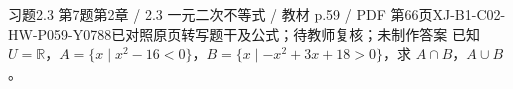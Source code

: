 \par\noindent\begin{minipage}{\linewidth}
\begin{bankitem}{习题2.3 第7题}{第2章 / 2.3 一元二次不等式 / 教材 p.59 / PDF 第66页}{XJ-B1-C02-HW-P059-Y0788}{已对照原页转写题干及公式；待教师复核；未制作答案}
已知 $U=\mathbb R$，$A=\{x\mid x^2-16<0\}$，$B=\{x\mid-x^2+3x+18>0\}$，求 $A\cap B$，$A\cup B$。
\end{bankitem}
\end{minipage}\par\medskip
